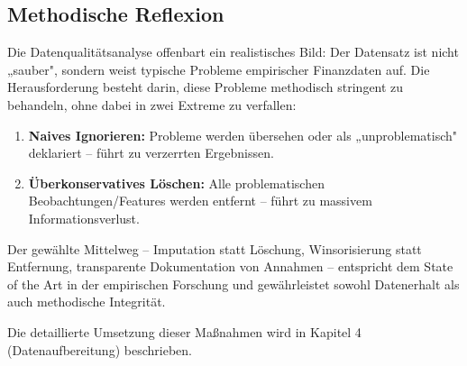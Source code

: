 \subsection{Methodische Reflexion}

Die Datenqualitätsanalyse offenbart ein realistisches Bild: Der Datensatz ist nicht „sauber", sondern weist typische Probleme empirischer Finanzdaten auf. Die Herausforderung besteht darin, diese Probleme methodisch stringent zu behandeln, ohne dabei in zwei Extreme zu verfallen:

\begin{enumerate}[topsep=0.2\baselineskip]
    \item \textbf{Naives Ignorieren:} Probleme werden übersehen oder als „unproblematisch" deklariert – führt zu verzerrten Ergebnissen.
    \item \textbf{Überkonservatives Löschen:} Alle problematischen Beobachtungen/Features werden entfernt – führt zu massivem Informationsverlust.
\end{enumerate}

Der gewählte Mittelweg – Imputation statt Löschung, Winsorisierung statt Entfernung, transparente Dokumentation von Annahmen – entspricht dem State of the Art in der empirischen Forschung und gewährleistet sowohl Datenerhalt als auch methodische Integrität.

Die detaillierte Umsetzung dieser Maßnahmen wird in Kapitel 4 (Datenaufbereitung) beschrieben.
